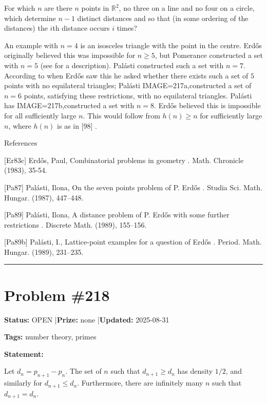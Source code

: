 \documentclass{article}
\begin{document}
For which $n$ are there $n$ points in $\mathbb{R}^2$, no three on a line and no four on a circle, which determine $n-1$ distinct distances and so that (in some ordering of the distances) the $i$th distance occurs $i$ times?




An example with $n=4$ is an isosceles triangle with the point in the centre. Erd\H{o}s originally believed this was impossible for $n\geq 5$, but Pomerance constructed a set with $n=5$ (see \cite{Er83c} for a description). Pal\'{a}sti \cite{Pa87} constructed such a set with $n=7$. According to \cite{Pa89} when Erd\H{o}s saw this he asked whether there exists such a set of $5$ points with no equilateral triangles; Pal\'{a}sti \cite{Pa89} {IMAGE=217a,constructed a set} of $n=6$ points, satisfying these restrictions, with no equilateral triangles. Pal\'{a}sti \cite{Pa89b} has {IMAGE=217b,constructed a set} with $n=8$. Erd\H{o}s believed this is impossible for all sufficiently large $n$. This would follow from $h(n)\geq n$ for sufficiently large $n$, where $h(n)$ is as in [98] .




References

[Er83c] Erd\H{o}s, Paul, Combinatorial problems in geometry . Math. Chronicle (1983), 35-54.

[Pa87] Pal\'{a}sti, Ilona, On the seven points problem of {P}. {E}rd\H os . Studia Sci. Math. Hungar. (1987), 447--448.

[Pa89] Pal\'{a}sti, Ilona, A distance problem of {P}. {E}rd\H os with some further restrictions . Discrete Math. (1989), 155--156.

[Pa89b] Pal\'{a}sti, I., Lattice-point examples for a question of {E}rd\H os . Period. Math. Hungar. (1989), 231--235.

\noindent\rule{\linewidth}{0.4pt}


\section{Problem \#218}
\label{prob:218}

\noindent\textbf{Status:} OPEN \quad|\quad \textbf{Prize:} none \quad|\quad \textbf{Updated:} 2025-08-31

\noindent\textbf{Tags:} number theory, primes

\medskip

\noindent\textbf{Statement:}

Let $d_n=p_{n+1}-p_n$. The set of $n$ such that $d_{n+1}\geq d_n$ has density $1/2$, and similarly for $d_{n+1}\leq d_n$. Furthermore, there are infinitely many $n$ such that $d_{n+1}=d_n$.
\end{document}
